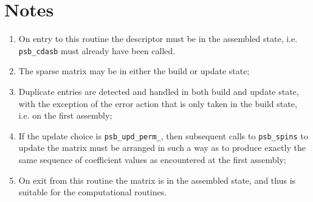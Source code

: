 \section*{Notes}
\begin{enumerate}
\item On entry to this routine the descriptor must  be in  the
  assembled state, i.e. \verb|psb_cdasb| must already have been called.
\item The sparse matrix may be in either the build or update state;
\item Duplicate entries are detected and handled in both build and
  update state, with the exception of the error action that is only
  taken in the build state, i.e. on the first assembly; 
\item If the update choice is \verb|psb_upd_perm_|, then subsequent
  calls to \verb|psb_spins| to update the matrix must be arranged in
  such a way as to produce exactly the same sequence of coefficient
  values as encountered at the first assembly; 
\item On exit from this routine the matrix is in the assembled state,
  and thus is suitable for the computational routines. 
\end{enumerate}









